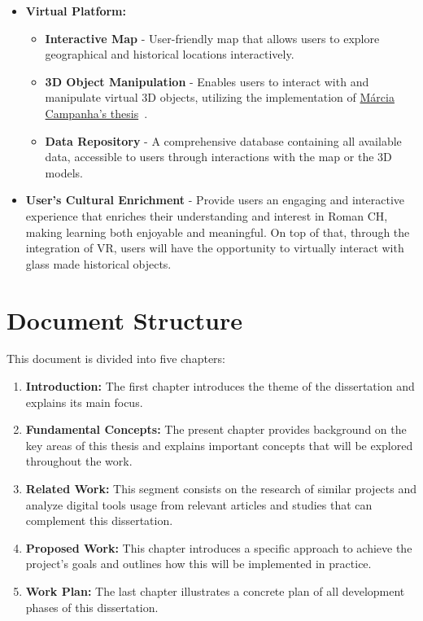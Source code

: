 \begin{itemize}
   \item \textbf{Virtual Platform:}
   \begin{itemize}
      \item \textbf{Interactive Map} - User-friendly map that allows users to explore geographical and historical locations interactively.
      \item \textbf{3D Object Manipulation} - Enables users to interact with and manipulate virtual 3D objects, utilizing the implementation of \hyperref[sec:marcia_thesis]{Márcia Campanha's thesis}~\cite{campanha2024heritage}.
      \item  \textbf{Data Repository} - A comprehensive database containing all available data, accessible to users through interactions with the map or the \gls{3D} models.
   \end{itemize}
   \item \textbf{User's Cultural Enrichment} - Provide users an engaging and interactive experience that enriches their understanding and interest
   in Roman \gls{CH}, making learning both enjoyable and meaningful.
   On top of that, through the integration of \gls{VR}, users will have the opportunity to virtually interact with glass made historical objects.
\end{itemize}


\section{Document Structure}
\label{sec:document_structure}


This document is divided into five chapters:


\begin{enumerate}
  \item \textbf{Introduction:} The first chapter introduces the theme of the dissertation and explains its main focus.
  
  \item \textbf{Fundamental Concepts:} The present chapter provides background on the key areas of this thesis and explains important concepts that will be explored throughout the work.
  
  \item \textbf{Related Work:} This segment consists on the research of similar projects and analyze digital tools usage from relevant articles and studies that can complement this dissertation.

  \item \textbf{Proposed Work:} This chapter introduces a specific approach to achieve the project's goals and outlines how this will be implemented in practice.
  
  \item \textbf{Work Plan:} The last chapter illustrates a concrete plan of all development phases of this dissertation.
\end{enumerate}
